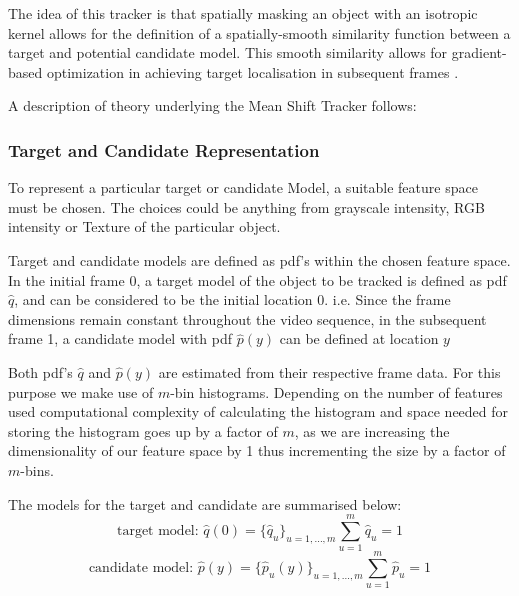 The idea of this tracker is that spatially masking an object with an
isotropic kernel allows for the definition of a spatially-smooth similarity
function between a target and potential candidate model. This smooth similarity
allows for gradient-based optimization in achieving target localisation in
subsequent frames \cite{Comaniciu2003}.

A description of theory underlying the Mean Shift Tracker follows:

\subsubsection{Target and Candidate Representation}
To represent a particular target or candidate Model, a suitable feature space
must be chosen. The choices could be anything from grayscale intensity, RGB
intensity or Texture of the particular object.

Target and candidate models are defined as pdf's within the chosen feature
space.
In the initial frame 0, a target model of the object to be tracked is defined as
pdf $\hat{q}$, and can be considered to be the initial location 0. i.e. 
Since the frame dimensions remain constant throughout the video sequence, in the
subsequent frame 1, a candidate model with pdf $\hat{p}(y)$ can be defined at location
$y$ 

Both pdf's $\hat{q}$ and $\hat{p}(y)$ are estimated from their respective frame data. For
this purpose we make use of $m$-bin histograms. Depending on the number of
features used computational complexity of calculating the histogram and space
needed for storing the histogram goes up by a factor of $m$, as we are
increasing the dimensionality of our feature space by 1 thus incrementing the
size by a factor of $m$-bins.

The models for the target and candidate are summarised below:
$$\text{target model: } \hat{q}(0)=\{\hat{q}_u\}_{u=1,...,m}
\sum_{u=1}^{m}\hat{q}_u = 1$$
$$\text{candidate model: } \hat{p}(y)=\{\hat{p}_u(y)\}_{u=1,...,m}
\sum_{u=1}^{m}\hat{p}_u = 1$$


